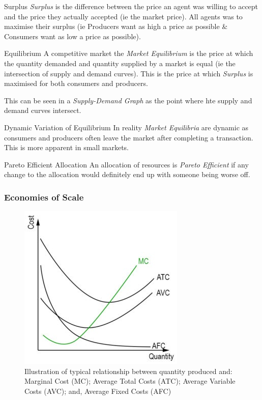 \documentclass[11pt,a4paper]{article}
\begin{document}
  \begin{definition}{Surplus}
    \textit{Surplus} is the difference between the price an agent was willing to accept and the price they actually accepted (ie the market price). All agents was to maximise their surplus (ie Producers want as high a price as possible \& Consumers want as low a price as possible).
  \end{definition}

  \begin{definition}{Equilibrium}
    A competitive market the \textit{Market Equilibrium} is the price at which the quantity demanded and quantity supplied by a market is equal (ie the intersection of supply and demand curves). This is the price at which \textit{Surplus} is maximised for both consumers and producers.
    \par This can be seen in a \textit{Supply-Demand Graph} as the point where hte supply and demand curves intersect.
  \end{definition}

  \begin{remark}{Dynamic Variation of Equilibrium}
    In reality \textit{Market Equilibria} are dynamic as consumers and producers often leave the market after completing a transaction. This is more apparent in small markets.
  \end{remark}

  \begin{definition}{Pareto Efficient Allocation}
    An allocation of resources is \textit{Pareto Efficient} if any change to the allocation would definitely end up with someone being worse off.
  \end{definition}

\subsubsection{Economies of Scale} \label{sec_EconomiesOfScale}

  \begin{figure}[ht!]
    \centering
    \includegraphics[width=.3\textwidth]{MarginalCostCurve.jpg}
    \caption{Illustration of typical relationship between quantity produced and: Marginal Cost (MC); Average Total Costs (ATC); Average Variable Costs (AVC); and, Average Fixed Costs (AFC)}
    \label{fig_MarginalCostCurve}
  \end{figure}
\end{document}
